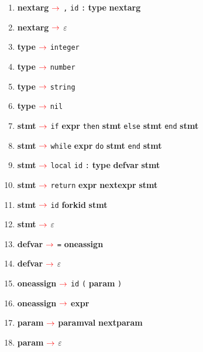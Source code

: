 \documentclass{article}
\def\nonterm #1{\boldmath{$<$}\textbf{#1}\boldmath{$>$}\space}
\def\term #1{\texttt{#1}\space}
\newcommand{\arrow} {$\color{red} \rightarrow$\space}
\newcommand{\unsc} {\underline{\hspace{0.2cm}}}
\begin{document}
\begin{enumerate}[label=\textcolor{red}{\arabic*.}]
        \item \nonterm{next\unsc{}arg} \arrow{} \term{,} \term{id} \term{:} \nonterm{type} \nonterm{next\unsc{}arg}
        
        \item \nonterm{next\unsc{}arg} \arrow{} \term{$\varepsilon$}
        
        \item \nonterm{type} \arrow{} \term{integer}
        \item \nonterm{type} \arrow{} \term{number}
        \item \nonterm{type} \arrow{} \term{string}
        \item \nonterm{type} \arrow{} \term{nil}
        
        \item \nonterm{stmt} \arrow{} \term{if} \nonterm{expr} \term{then} \nonterm{stmt} \term{else} \nonterm{stmt} \term{end} \nonterm{stmt}
        
        \item \nonterm{stmt} \arrow{} \term{while} \nonterm{expr} \term{do} \nonterm{stmt} \term{end} \nonterm{stmt}
        
        \item \nonterm{stmt} \arrow{} \term{local} \term{id} \term{:} \nonterm{type} \nonterm{def\unsc{}var} \nonterm{stmt}
        
        \item \nonterm{stmt} \arrow{} \term{return} \nonterm{expr} \nonterm{next\unsc{}expr} \nonterm{stmt}
        
        \item \nonterm{stmt} \arrow{} \term{id} \nonterm{fork\unsc{}id} \nonterm{stmt}
        
        \item \nonterm{stmt} \arrow{} \term{$\varepsilon$}
        
        \item \nonterm{def\unsc{}var} \arrow{} \term{=} \nonterm{one\unsc{}assign}
        \item \nonterm{def\unsc{}var} \arrow{} \term{$\varepsilon$}
        
        \item \nonterm{one\unsc{}assign} \arrow{} \term{id} \term{(} \nonterm{param} \term{)}
        \item \nonterm{one\unsc{}assign} \arrow{} \nonterm{expr}
                
        \item \nonterm{param} \arrow{} \nonterm{param\unsc{}val} \nonterm{next\unsc{}param}
        \item \nonterm{param} \arrow{} \term{$\varepsilon$}
        

\end{enumerate}
\end{document}

